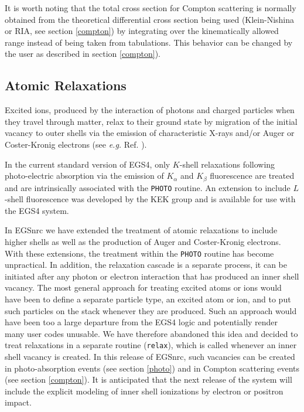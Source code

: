 It is worth noting that the total cross section for Compton scattering is 
normally obtained from the theoretical differential cross section being used 
(Klein-Nishina or RIA, see section \ref{compton}) by 
integrating over the kinematically allowed range instead of being taken from 
tabulations. This behavior can be changed by the user as described in 
section \ref{compton}).
 
\subsection{Atomic Relaxations}
\label{relax}

Excited ions, produced by the interaction of photons and 
charged particles when they travel through matter, relax to 
their ground state by migration of the initial vacancy to 
outer shells via the emission of characteristic X-rays and/or 
Auger or Coster-Kronig electrons (see {\em e.g.} Ref. \cite{Pe91}). 

In the current standard version of EGS4, only $K$-shell relaxations following 
photo-electric absorption via 
the emission of $K_\alpha$ and $K_\beta$ fluorescence are treated 
and are intrinsically associated with the {\tt PHOTO} routine. 
An extension to include $L$-shell fluorescence was developed by the 
KEK group \cite{Na98} and is available for use with the EGS4 system.

In EGSnrc we have extended the treatment of atomic relaxations 
to include higher shells as well as the production of Auger and 
Coster-Kronig electrons. With these extensions, the 
treatment within the {\tt PHOTO} routine 
has become unpractical. In addition, the relaxation cascade  
is a separate process, it can be initiated after any photon 
or electron interaction that has produced an inner shell vacancy. 
The most general approach for treating excited atoms or ions would have 
been to define a separate particle type, an excited atom or ion, and to 
put such particles on the stack whenever they are produced. 
Such an approach would have been too a large departure from 
the EGS4 logic and potentially render many user codes unusable. 
We have therefore abandoned this idea and decided to 
treat relaxations in a separate routine ({\tt relax}), 
which is called whenever an inner shell vacancy is created. 
In this release of EGSnrc, such vacancies can be created in 
photo-absorption events (see section \ref{photo}) and in 
Compton scattering events (see section \ref{compton}). 
It is anticipated that the next release of the system 
will include the explicit modeling of inner shell 
ionizations by electron or positron impact. 

